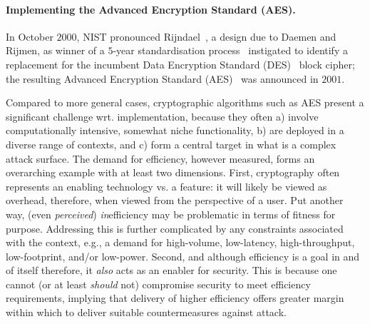 
\paragraph{Implementing the Advanced Encryption Standard (AES).}

In October $2000$, NIST pronounced Rijndael~\cite{DaeRij:98,DaeRij:02}, 
a design due to Daemen and Rijmen, 
as winner of a $5$-year standardisation process~\cite{NBBBDFR:01} instigated 
to identify a replacement for the incumbent
Data     Encryption Standard (DES)~\cite{FIPS:46} 
block cipher; the resulting 
Advanced Encryption Standard (AES)~\cite{FIPS:197} 
was announced in $2001$.

Compared to more general cases, cryptographic algorithms such as AES present a
significant challenge wrt. implementation, because they often
a) involve computationally intensive, somewhat niche functionality,
b) are deployed in a diverse range of contexts,
   and
c) form a central target in what is a complex attack surface.
The demand for efficiency, however measured, forms an overarching example
with at least two dimensions.
First,
cryptography often represents an enabling technology vs. a feature: it will
likely be viewed as overhead, therefore, when viewed from the perspective 
of a user.  Put another way,  (even {\em perceived}) {\em in}efficiency may
be problematic in terms of fitness for purpose.  Addressing this is further 
complicated by any constraints associated with the context, e.g., a demand 
for
high-volume, 
 low-latency, 
high-throughput, 
 low-footprint, 
and/or 
 low-power.
Second,
and although efficiency is a goal in and of itself therefore, it {\em also} 
acts as an enabler for security.  This is because one cannot 
(or at least {\em should} not) 
compromise security to meet efficiency requirements, implying that delivery 
of higher efficiency offers greater margin within which to deliver suitable
countermeasures against attack.

